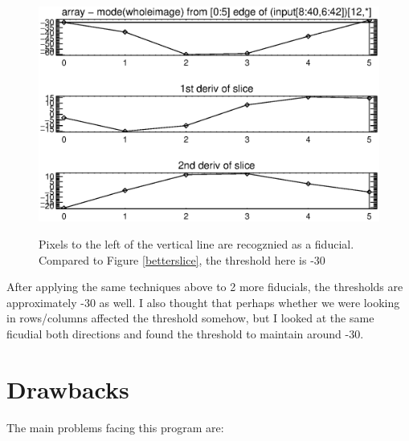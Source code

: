 \documentclass[10pt]{article}
\begin{document}
\begin{figure}[!ht]
{        \includegraphics[width=0.5\linewidth, height = .34\textheight, keepaspectratio=true]{plots_tables_images/anotherslice6.eps}
        }
        \caption{Pixels to the left of the vertical line are recogznied as a fiducial. Compared to Figure \ref{betterslice}, the threshold here is -30}
        \label{anotherslice}
\end{figure}

After applying the same techniques above to 2 more fiducials, the thresholds are approximately -30 as well. I also thought that perhaps whether we were looking in rows/columns affected the threshold somehow, but I looked at the same ficudial both directions and found the threshold to maintain around -30. 

\section{Drawbacks}

    The main problems facing this program are:
\end{document}
